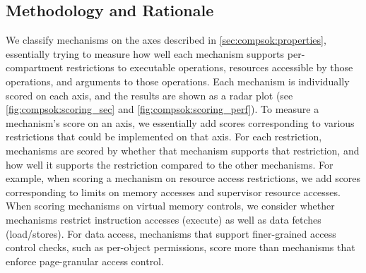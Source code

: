 \subsection{Methodology and Rationale}
\label{sec:compsok:methodology}
We classify mechanisms on the axes described in 
\autoref{sec:compsok:properties}, essentially trying to measure how well 
each mechanism supports per-compartment restrictions to executable operations,
resources accessible by those operations, and arguments to those operations.
Each mechanism is individually scored on each axis, and the results are shown
as a radar plot (see \autoref{fig:compsok:scoring_sec} and 
\autoref{fig:compsok:scoring_perf}).
To measure a mechanism's score on an axis, we essentially add scores 
corresponding to various restrictions that could be implemented on that axis.
For each restriction, mechanisms are scored by whether that mechanism supports
that restriction, and how well it supports the restriction compared to the 
other mechanisms.
For example, when scoring a mechanism on resource access restrictions, we
add scores corresponding to limits on memory accesses and supervisor resource
accesses.
When scoring mechanisms on virtual memory controls, we consider whether
mechanisms restrict instruction accesses (execute) as well as 
data fetches (load/stores).
For data access, mechanisms that support finer-grained access control checks, 
such as per-object permissions, score more than mechanisms that enforce 
page-granular access control.

